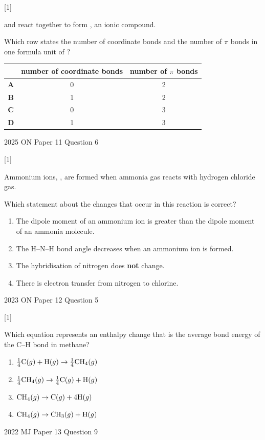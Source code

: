 \documentclass[10pt,a4paper]{article}
\newcommand{\qhead}[2]{%
  \par\vspace{0.28em}%
  \Needspace{4.2em}%
  \noindent{\small\textbf{#1}}\hfill{\small[#2]}\par\vspace{0.08em}%
}
\newcommand{\sourcefoot}[1]{%
  {\footnotesize\color{gray}#1}\par
}
\begin{document}
\Needspace{14em}
\qhead{A6.}{1}
{\small {} and  react together to form , an ionic compound.}

{\small Which row states the number of coordinate bonds and the number of $\pi$ bonds in one formula unit of ?}

\vspace{0.10em}
\centering
{\small
\begin{tabular}{ccc}
\toprule
 & number of coordinate bonds & number of $\pi$ bonds \\
\midrule
\textbf{A} & 0 & 2 \\
\textbf{B} & 1 & 2 \\
\textbf{C} & 0 & 3 \\
\textbf{D} & 1 & 3 \\
\bottomrule
\end{tabular}}
\par\raggedright
\sourcefoot{2025 ON Paper 11 Question 6}

\qhead{A7.}{1}
{\small Ammonium ions, , are formed when ammonia gas reacts with hydrogen chloride gas.}

{\small Which statement about the changes that occur in this reaction is correct?}
\begin{enumerate}[label=\textbf{\Alph*}, leftmargin=1.7em, itemsep=0.08em]
\item The dipole moment of an ammonium ion is greater than the dipole moment of an ammonia molecule.
\item The H--N--H bond angle decreases when an ammonium ion is formed.
\item The hybridisation of nitrogen does \textbf{not} change.
\item There is electron transfer from nitrogen to chlorine.
\end{enumerate}
\sourcefoot{2023 ON Paper 12 Question 5}

\Needspace{14em}
\qhead{A8.}{1}
{\small Which equation represents an enthalpy change that is the average bond energy of the C--H bond in methane?}
\begin{enumerate}[label=\textbf{\Alph*}, leftmargin=1.7em, itemsep=0.10em]
\item $\tfrac{1}{4}\ce{C}(g) + \ce{H}(g) \rightarrow \tfrac{1}{4}\ce{CH4}(g)$
\item $\tfrac{1}{4}\ce{CH4}(g) \rightarrow \tfrac{1}{4}\ce{C}(g) + \ce{H}(g)$
\item $\ce{CH4}(g) \rightarrow \ce{C}(g) + 4\ce{H}(g)$
\item $\ce{CH4}(g) \rightarrow \ce{CH3}(g) + \ce{H}(g)$
\end{enumerate}
\sourcefoot{2022 MJ Paper 13 Question 9}
\end{document}
